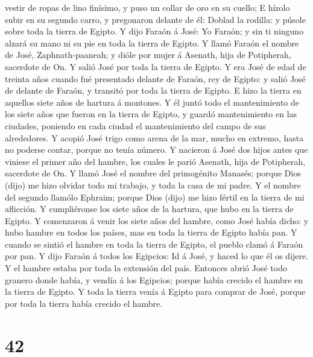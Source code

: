 vestir de ropas de lino finísimo, y puso un collar de oro en su cuello;
 E hízolo subir en su segundo carro, y pregonaron delante
de él: Doblad la rodilla: y púsole sobre toda la tierra de Egipto.
 Y dijo Faraón á José: Yo Faraón; y sin ti ninguno alzará
su mano ni su pie en toda la tierra de Egipto.  Y llamó
Faraón el nombre de José, Zaphnath-paaneah; y dióle por mujer á Asenath,
hija de Potipherah, sacerdote de On. Y salió José por toda la tierra de
Egipto.  Y era José de edad de treinta años cuando fué
presentado delante de Faraón, rey de Egipto: y salió José de delante de
Faraón, y transitó por toda la tierra de Egipto.  E hizo la
tierra en aquellos siete años de hartura á montones.  Y él
juntó todo el mantenimiento de los siete años que fueron en la tierra de
Egipto, y guardó mantenimiento en las ciudades, poniendo en cada ciudad
el mantenimiento del campo de sus alrededores.  Y acopió
José trigo como arena de la mar, mucho en extremo, hasta no poderse
contar, porque no tenía número.  Y nacieron á José dos
hijos antes que viniese el primer año del hambre, los cuales le parió
Asenath, hija de Potipherah, sacerdote de On.  Y llamó José
el nombre del primogénito Manasés; porque Dios (dijo) me hizo olvidar
todo mi trabajo, y toda la casa de mi padre.  Y el nombre
del segundo llamólo Ephraim; porque Dios (dijo) me hizo fértil en la
tierra de mi aflicción.  Y cumpliéronse los siete años de
la hartura, que hubo en la tierra de Egipto.  Y comenzaron
á venir los siete años del hambre, como José había dicho: y hubo hambre
en todos los países, mas en toda la tierra de Egipto había pan.
 Y cuando se sintió el hambre en toda la tierra de Egipto,
el pueblo clamó á Faraón por pan. Y dijo Faraón á todos los Egipcios: Id
á José, y haced lo que él os dijere.  Y el hambre estaba
por toda la extensión del país. Entonces abrió José todo granero donde
había, y vendía á los Egipcios; porque había crecido el hambre en la
tierra de Egipto.  Y toda la tierra venía á Egipto para
comprar de José, porque por toda la tierra había crecido el hambre.

\hypertarget{section-41}{%
\section{42}\label{section-41}}

